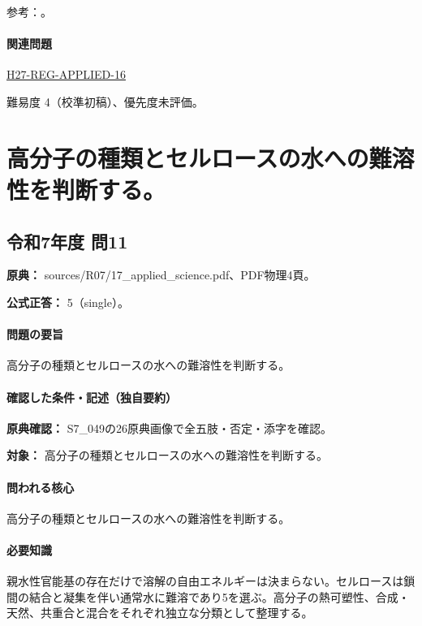 \par 参考：\cite{analysis49_amino_ref,analysis49_rna_ref}。

\paragraph{関連問題} \hyperref[q:h27-reg-applied-16]{H27-REG-APPLIED-16}

\par 難易度 4（校準初稿）、優先度未評価。

\section{高分子の種類とセルロースの水への難溶性を判断する。}

\subsection{令和7年度 問11}
\label{q:r07-reg-applied-11}

\noindent\textbf{原典：} sources/R07/17\_applied\_science.pdf、PDF物理4頁。

\textbf{公式正答：} 5（single）。

\paragraph{問題の要旨} 高分子の種類とセルロースの水への難溶性を判断する。

\paragraph{確認した条件・記述（独自要約）}\mbox{}\par

\noindent\textbf{原典確認：} S7\_049の26原典画像で全五肢・否定・添字を確認。\par

\noindent\textbf{対象：} 高分子の種類とセルロースの水への難溶性を判断する。\par

\paragraph{問われる核心} 高分子の種類とセルロースの水への難溶性を判断する。

\paragraph{必要知識} 親水性官能基の存在だけで溶解の自由エネルギーは決まらない。セルロースは鎖間の結合と凝集を伴い通常水に難溶であり5を選ぶ。高分子の熱可塑性、合成・天然、共重合と混合をそれぞれ独立な分類として整理する。

